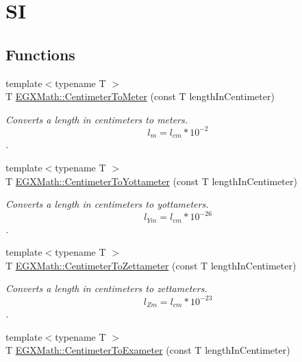 \hypertarget{group___e_g_x_math-_conversions-_length_conversions-_centimeter-_s_i}{}\section{SI}
\label{group___e_g_x_math-_conversions-_length_conversions-_centimeter-_s_i}
\subsection*{Functions}
\begin{DoxyCompactItemize}
\item 
{\footnotesize template$<$typename T $>$ }\\T \mbox{\hyperlink{group___e_g_x_math-_conversions-_length_conversions-_centimeter-_s_i_gaebbc38cdc9fa18257e8cf4a0bbbb117a}{E\+G\+X\+Math\+::\+Centimeter\+To\+Meter}} (const T length\+In\+Centimeter)
\begin{DoxyCompactList}\small\item\em Converts a length in centimeters to meters. \[ l_{m}=l_{cm} * 10^{-2} \]. \end{DoxyCompactList}\item 
{\footnotesize template$<$typename T $>$ }\\T \mbox{\hyperlink{group___e_g_x_math-_conversions-_length_conversions-_centimeter-_s_i_gace13ddc9d41561595a03d858577763c3}{E\+G\+X\+Math\+::\+Centimeter\+To\+Yottameter}} (const T length\+In\+Centimeter)
\begin{DoxyCompactList}\small\item\em Converts a length in centimeters to yottameters. \[ l_{Ym}=l_{cm} * 10^{-26} \]. \end{DoxyCompactList}\item 
{\footnotesize template$<$typename T $>$ }\\T \mbox{\hyperlink{group___e_g_x_math-_conversions-_length_conversions-_centimeter-_s_i_ga20ad80d764e7cc6f34245fe2ab4e7772}{E\+G\+X\+Math\+::\+Centimeter\+To\+Zettameter}} (const T length\+In\+Centimeter)
\begin{DoxyCompactList}\small\item\em Converts a length in centimeters to zettameters. \[ l_{Zm}=l_{cm} * 10^{-23} \]. \end{DoxyCompactList}\item 
{\footnotesize template$<$typename T $>$ }\\T \mbox{\hyperlink{group___e_g_x_math-_conversions-_length_conversions-_centimeter-_s_i_ga8b69e702b6a245a68f57d52474f21c1a}{E\+G\+X\+Math\+::\+Centimeter\+To\+Exameter}} (const T length\+In\+Centimeter)

\end{DoxyCompactItemize}
